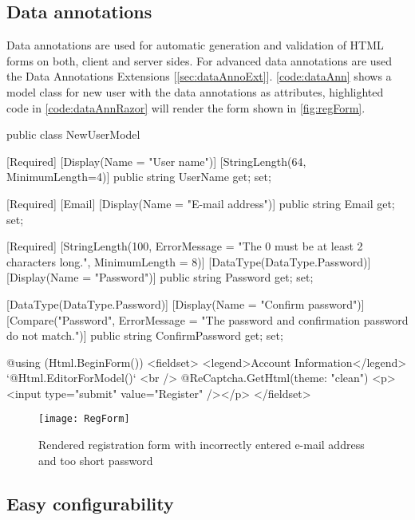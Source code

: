 \subsection{Data annotations}
\label{sec:implDataAnn}	

Data annotations are used for automatic generation and validation of HTML forms on both, client and server sides.
For advanced data annotations are used the Data Annotations Extensions [\ref{sec:dataAnnoExt}].
\autoref{code:dataAnn} shows a model class for new user with the data annotations as attributes,
	highlighted code in \autoref{code:dataAnnRazor} will render the form shown in \autoref{fig:regForm}.


\begin{Csharp}[label=code:dataAnn,caption={Model class with data annotations}]
public class NewUserModel {
	[Required]
	[Display(Name = "User name")]
	[StringLength(64, MinimumLength=4)]
	public string UserName { get; set; }

	[Required]
	[Email]
	[Display(Name = "E-mail address")]
	public string Email { get; set; }

	[Required]
	[StringLength(100, ErrorMessage = "The {0} must be at least {2} characters long.",
		MinimumLength = 8)]
	[DataType(DataType.Password)]
	[Display(Name = "Password")]
	public string Password { get; set; }

	[DataType(DataType.Password)]
	[Display(Name = "Confirm password")]
	[Compare("Password",
		ErrorMessage = "The password and confirmation password do not match.")]
	public string ConfirmPassword { get; set; }
}
\end{Csharp}

\begin{Razor}[label=code:dataAnnRazor,caption={Part of user registration view}]
@using (Html.BeginForm()) {
	<fieldset>
		<legend>Account Information</legend>
		`@Html.EditorForModel()`
		<br />
		@ReCaptcha.GetHtml(theme: "clean")
		<p><input type="submit" value="Register" /></p>
	</fieldset>
}
\end{Razor}

\begin{figure}[h!]
	\centering
	\texttt{[image: RegForm]}
	\caption{Rendered registration form with incorrectly entered e-mail address and too short password}
	\label{fig:regForm}
\end{figure}




\subsection{Easy configurability}

